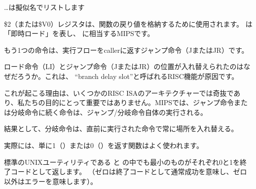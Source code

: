 

\dots \IDA は擬似名でリストします



\$2（または\$V0）レジスタは、関数の戻り値を格納するために使用されます。 
は「即時ロード」を表し、 \MOV に相当するMIPSです。

もう1つの命令は、実行フローを\gls{caller}に返すジャンプ命令（JまたはJR）です。

ロード命令（LI）とジャンプ命令（JまたはJR）の位置が入れ替えられたのはなぜだろうか。これは、 ``branch delay slot''と呼ばれる\ac{RISC}機能が原因です。

これが起こる理由は、いくつかのRISC \ac{ISA}のアーキテクチャーでは奇抜であり、私たちの目的にとって重要ではありません。MIPSでは、ジャンプ命令または分岐命令に続く命令は、ジャンプ/分岐命令自体の実行される。

結果として、分岐命令は、直前に実行された命令で常に場所を入れ替える。

実際には、単に1（）または0（）を返す関数はよく使われます。

標準のUNIXユーティリティである と の中でも最小のものがそれぞれ0と1を終了コードとして返します。
（ゼロは終了コードとして通常成功を意味し、ゼロ以外はエラーを意味します）。

